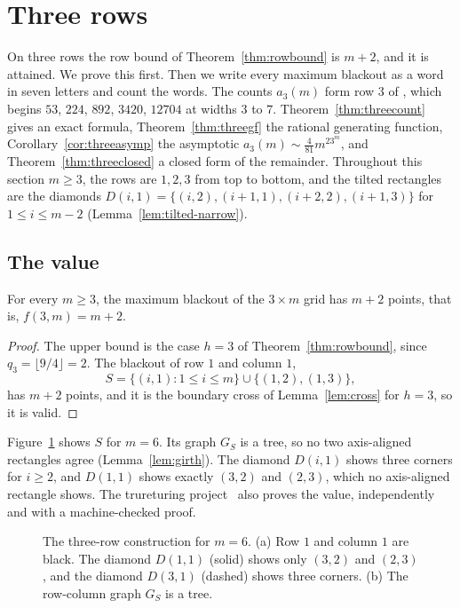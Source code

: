 \section{Three rows}\label{sec:three}

On three rows the row bound of Theorem~\ref{thm:rowbound} is $m+2$, and it is attained. We
prove this first. Then we write every maximum blackout as a word in seven letters and count
the words. The counts $a_3(m)$ form row $3$ of , which begins $53$, $224$,
$892$, $3420$, $12704$ at widths $3$ to $7$. Theorem~\ref{thm:threecount} gives an exact
formula, Theorem~\ref{thm:threegf} the rational generating function,
Corollary~\ref{cor:threeasymp} the asymptotic $a_3(m)\sim\frac4{81}m^23^m$, and
Theorem~\ref{thm:threeclosed} a closed form of the remainder. Throughout this section
$m\ge3$, the rows are $1,2,3$ from top to bottom, and the tilted rectangles are the diamonds
$D(i,1)=\{(i,2),(i+1,1),(i+2,2),(i+1,3)\}$ for $1\le i\le m-2$
(Lemma~\ref{lem:tilted-narrow}).

\subsection{The value}

\begin{theorem}\label{thm:threevalue}
For every $m\ge3$, the maximum blackout of the $3\times m$ grid has $m+2$ points, that is,
$f(3,m)=m+2$.
\end{theorem}

\begin{proof}
The upper bound is the case $h=3$ of Theorem~\ref{thm:rowbound}, since
$q_3=\lfloor9/4\rfloor=2$. The blackout of row $1$ and column $1$,
\[
S=\{(i,1):1\le i\le m\}\cup\{(1,2),(1,3)\},
\]
has $m+2$ points, and it is the boundary cross of Lemma~\ref{lem:cross} for $h=3$, so it is
valid.
\end{proof}

Figure~\ref{fig:three} shows $S$ for $m=6$. Its graph $G_S$ is a tree, so no two axis-aligned
rectangles agree (Lemma~\ref{lem:girth}). The diamond $D(i,1)$ shows three corners for
$i\ge2$, and $D(1,1)$ shows exactly $(3,2)$ and $(2,3)$, which no axis-aligned rectangle shows.
The trureturing project~\cite{trureturing2026} also proves the value, independently and with
a machine-checked proof.

\begin{figure}[t]
\centering

\caption{The three-row construction for $m=6$. (a) Row $1$ and column $1$ are black. The diamond
$D(1,1)$ (solid) shows only $(3,2)$ and $(2,3)$, and the diamond $D(3,1)$ (dashed) shows three
corners. (b) The row-column graph $G_S$ is a tree.}
\label{fig:three}
\end{figure}

